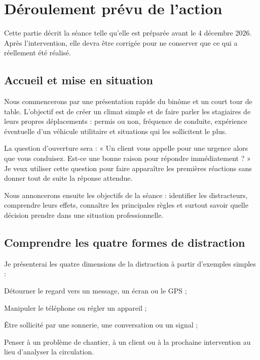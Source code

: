 \chapter{Déroulement prévu de l'action}
Cette partie décrit la séance telle qu’elle est préparée avant le 4 décembre 2026. Après l’intervention, elle devra être corrigée pour ne conserver que ce qui a réellement été réalisé.

\section{Accueil et mise en situation}

Nous commencerons par une présentation rapide du binôme et un court tour de table. L’objectif est de créer un climat simple et de faire parler les stagiaires de leurs propres déplacements : permis ou non, fréquence de conduite, expérience éventuelle d’un véhicule utilitaire et situations qui les sollicitent le plus.

La question d’ouverture sera : « Un client vous appelle pour une urgence alors que vous conduisez. Est-ce une bonne raison pour répondre immédiatement ? » Je veux utiliser cette question pour faire apparaître les premières réactions sans donner tout de suite la réponse attendue.

Nous annoncerons ensuite les objectifs de la séance : identifier les distracteurs, comprendre leurs effets, connaître les principales règles et surtout savoir quelle décision prendre dans une situation professionnelle.

\section{Comprendre les quatre formes de distraction}

Je présenterai les quatre dimensions de la distraction à partir d'exemples simples :
\begin{description}[leftmargin=2.7cm,style=nextline]
\item[Visuelle] Détourner le regard vers un message, un écran ou le GPS ;
\item[Manuelle] Manipuler le téléphone ou régler un appareil ;
\item[Auditive] Être sollicité par une sonnerie, une conversation ou un signal ;
\item[Cognitive] Penser à un problème de chantier, à un client ou à la prochaine intervention au lieu d'analyser la circulation.
\end{description}

